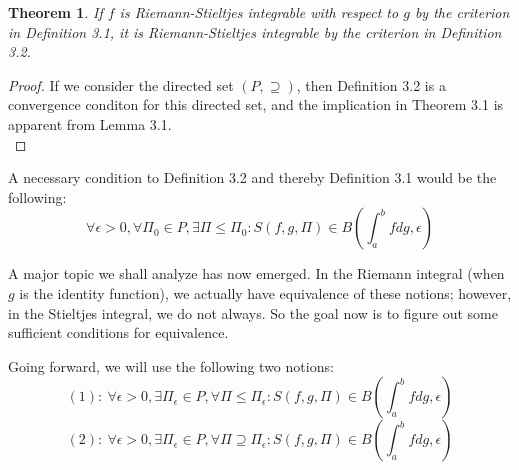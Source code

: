 \documentclass[10pt,letterpaper]{article} %
\newtheorem{thm}{Theorem}[section]
\begin{document}
\begin{thm}
If $f$ is Riemann-Stieltjes integrable with respect to $g$ by the criterion in Definition 3.1, it is Riemann-Stieltjes integrable by the criterion in Definition 3.2.
\end{thm}
\begin{proof}
If we consider the directed set $(P, \supseteq)$, then Definition 3.2 is a convergence conditon for this directed set, and the implication in Theorem 3.1 is apparent from Lemma 3.1.\\
\end{proof}
A necessary condition to Definition 3.2 and thereby Definition 3.1 would be the following:
\begin{equation*}
\forall \epsilon > 0, \forall \Pi_0 \in P, \exists \Pi \leq \Pi_0: S(f, g, \Pi) \in B\left(\int_{a}^{b}fdg, \epsilon\right)
\end{equation*}


A major topic we shall analyze has now emerged. In the Riemann integral (when $g$ is the identity function), we actually have equivalence of these notions; however, in the Stieltjes integral, we do not always. So the goal now is to figure out some sufficient conditions for equivalence.

Going forward, we will use the following two notions:
\begin{equation*}
(1): \ \forall \epsilon > 0, \exists \Pi_\epsilon \in P, \forall \Pi \leq \Pi_\epsilon: S(f, g, \Pi) \in B\left(\int_{a}^{b}fdg, \epsilon\right)
\end{equation*}
\begin{equation*}
(2): \ \forall \epsilon > 0, \exists \Pi_\epsilon \in P, \forall \Pi \supseteq \Pi_\epsilon: S(f, g, \Pi) \in B\left(\int_{a}^{b}fdg, \epsilon\right)
\end{equation*}
\end{document}
